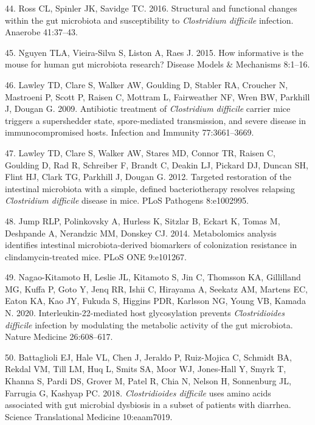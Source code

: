 \documentclass[11pt,]{article}
\begin{document}
\hypertarget{ref-Ross2016}{}
44. Ross CL, Spinler JK, Savidge TC. 2016. Structural and functional
changes within the gut microbiota and susceptibility to
\emph{Clostridium difficile} infection. Anaerobe 41:37--43.

\hypertarget{ref-Nguyen2015}{}
45. Nguyen TLA, Vieira-Silva S, Liston A, Raes J. 2015. How informative
is the mouse for human gut microbiota research? Disease Models \&
Mechanisms 8:1--16.

\hypertarget{ref-Lawley2009}{}
46. Lawley TD, Clare S, Walker AW, Goulding D, Stabler RA, Croucher N,
Mastroeni P, Scott P, Raisen C, Mottram L, Fairweather NF, Wren BW,
Parkhill J, Dougan G. 2009. Antibiotic treatment of \emph{Clostridium
difficile} carrier mice triggers a supershedder state, spore-mediated
transmission, and severe disease in immunocompromised hosts. Infection
and Immunity 77:3661--3669.

\hypertarget{ref-Lawley2012}{}
47. Lawley TD, Clare S, Walker AW, Stares MD, Connor TR, Raisen C,
Goulding D, Rad R, Schreiber F, Brandt C, Deakin LJ, Pickard DJ, Duncan
SH, Flint HJ, Clark TG, Parkhill J, Dougan G. 2012. Targeted restoration
of the intestinal microbiota with a simple, defined bacteriotherapy
resolves relapsing \emph{Clostridium difficile} disease in mice. PLoS
Pathogens 8:e1002995.

\hypertarget{ref-Jump2014}{}
48. Jump RLP, Polinkovsky A, Hurless K, Sitzlar B, Eckart K, Tomas M,
Deshpande A, Nerandzic MM, Donskey CJ. 2014. Metabolomics analysis
identifies intestinal microbiota-derived biomarkers of colonization
resistance in clindamycin-treated mice. PLoS ONE 9:e101267.

\hypertarget{ref-NagaoKitamoto2020}{}
49. Nagao-Kitamoto H, Leslie JL, Kitamoto S, Jin C, Thomsson KA,
Gillilland MG, Kuffa P, Goto Y, Jenq RR, Ishii C, Hirayama A, Seekatz
AM, Martens EC, Eaton KA, Kao JY, Fukuda S, Higgins PDR, Karlsson NG,
Young VB, Kamada N. 2020. Interleukin-22-mediated host glycosylation
prevents \emph{Clostridioides difficile} infection by modulating the
metabolic activity of the gut microbiota. Nature Medicine 26:608--617.

\hypertarget{ref-Battaglioli2018}{}
50. Battaglioli EJ, Hale VL, Chen J, Jeraldo P, Ruiz-Mojica C, Schmidt
BA, Rekdal VM, Till LM, Huq L, Smits SA, Moor WJ, Jones-Hall Y, Smyrk T,
Khanna S, Pardi DS, Grover M, Patel R, Chia N, Nelson H, Sonnenburg JL,
Farrugia G, Kashyap PC. 2018. \emph{Clostridioides difficile} uses amino
acids associated with gut microbial dysbiosis in a subset of patients
with diarrhea. Science Translational Medicine 10:eaam7019.
\end{document}
